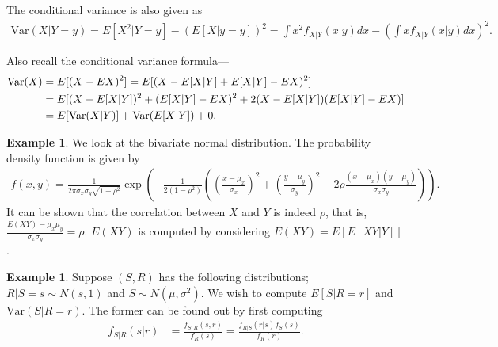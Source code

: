\documentclass[15pt,a4paper]{book}
\theoremstyle{definition}
\newtheorem{example}[theorem]{Example}
\newcommand{\Var}{\text{Var}}
\begin{document}
The conditional variance is also given as
\begin{align}
    \Var(X|Y=y) = E[X^{2}|Y=y] - (E[X|y=y])^{2} = \int x^{2} f_{X|Y}(x|y) dx - \left( \int x f_{X|Y}(x|y) dx \right)^{2}.
\end{align}

Also recall the conditional variance formula---
\begin{align}
    \Var(X) &= E[(X-EX)^{2}] = E[(X-E[X|Y]+E[X|Y]-EX)^{2}] \notag \\
    &= E[(X-E[X|Y])^{2} + (E[X|Y]-EX)^{2} + 2(X-E[X|Y])(E[X|Y]-EX)] \notag \\
    &= E[\text{Var}(X|Y)] + \text{Var}(E[X|Y]) + 0.
\end{align}

\begin{example}
    We look at the bivariate normal distribution. The probability density function is given by
    \begin{align}
        f(x,y) = \frac{1}{2\pi \sigma_{x}\sigma_{y} \sqrt{1-\rho^{2}}} \exp \left( -\frac{1}{2(1-\rho^{2})} \left( \left( \frac{x-\mu_{x}}{\sigma_{x}} \right)^{2} + \left( \frac{y-\mu_{y}}{\sigma_{y}} \right)^{2} -2\rho \frac{(x-\mu_{x})(y-\mu_{y})}{\sigma_{x} \sigma_{y}} \right) \right).
    \end{align}
    It can be shown that the correlation between $X$ and $Y$ is indeed $\rho$, that is, $\frac{E(XY)-\mu_{x}\mu_{y}}{\sigma_{x}\sigma_{y}} = \rho$. $E(XY)$ is computed by considering $E(XY) = E[E[XY|Y]]$.
\end{example}

\begin{example}
    Suppose $(S,R)$ has the following distributions; $R|S=s \sim N(s,1)$ and $S \sim N(\mu,\sigma^{2})$. We wish to compute $E[S|R=r]$ and $\Var(S|R=r)$. The former can be found out by first computing
    \begin{align}
        f_{S|R}(s|r) &= \frac{f_{S,R}(s,r)}{f_{R}(s)} = \frac{f_{R|S}(r|s) f_{S}(s)}{f_{R}(r)}.
    \end{align}
\end{example}


\end{document}
